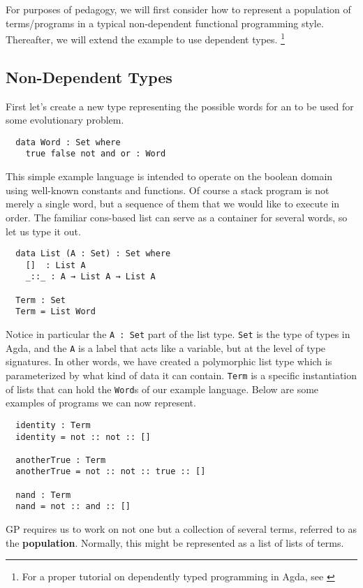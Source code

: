 \documentclass{acm_proc_article-sp}
\begin{document}
For purposes of pedagogy, we will first consider how to represent a
population of terms/programs in a typical non-dependent functional
programming style. Thereafter, we will extend the example to use
dependent types.
\footnote{For a proper tutorial on dependently typed programming in Agda, see \cite{to:do}}

\subsection{Non-Dependent Types}

First let's create a new type representing the possible words for an
to be used for some evolutionary problem.

\begin{verbatim}
  data Word : Set where
    true false not and or : Word
\end{verbatim}

This simple example language is intended to operate on the boolean domain using
well-known constants and functions. Of course a stack program is not
merely a single word, but a sequence of them that we would like to
execute in order. The familiar cons-based list can serve as a
container for several words, so let us type it out.

\begin{verbatim}
  data List (A : Set) : Set where
    []  : List A
    _::_ : A → List A → List A

  Term : Set
  Term = List Word
\end{verbatim}

Notice in particular the \texttt{A : Set} part of the list
type. \texttt{Set} is the type of types in Agda, and the \texttt{A} is
a label that acts like a variable, but at the level of type
signatures. In other words, we have created a polymorphic list type
which is parameterized by what kind of data it can
contain. \texttt{Term} is a specific instantiation of lists that can
hold the \texttt{Word}s of our example language. Below are some
examples of programs we can now represent.

\begin{verbatim}
  identity : Term
  identity = not :: not :: []

  anotherTrue : Term
  anotherTrue = not :: not :: true :: []

  nand : Term
  nand = not :: and :: []
\end{verbatim}

GP requires us to work on not one but a collection of several terms,
referred to as the \textbf{population}. Normally, this might be
represented as a list of lists of terms.
\end{document}

